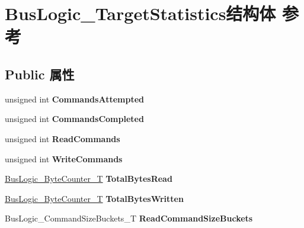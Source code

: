 \hypertarget{struct_bus_logic___target_statistics}{}\section{Bus\+Logic\+\_\+\+Target\+Statistics结构体 参考}
\label{struct_bus_logic___target_statistics}
\subsection*{Public 属性}
\begin{DoxyCompactItemize}
\item 
\mbox{\label{struct_bus_logic___target_statistics_a99b64ddca54d20f89863471aaa9c0d3e}} 
unsigned int {\bfseries Commands\+Attempted}
\item 
\mbox{\label{struct_bus_logic___target_statistics_a0f51c87caa558aac1d8c3b4694fbb81d}} 
unsigned int {\bfseries Commands\+Completed}
\item 
\mbox{\label{struct_bus_logic___target_statistics_a5391378dbcb342d84d25722ca0abeca8}} 
unsigned int {\bfseries Read\+Commands}
\item 
\mbox{\label{struct_bus_logic___target_statistics_a23b9a383a0785678bf3bf4a602c0ccfe}} 
unsigned int {\bfseries Write\+Commands}
\item 
\mbox{\label{struct_bus_logic___target_statistics_abc62f6380035545e3a634aa6a6d12ca5}} 
\hyperlink{struct_bus_logic___byte_counter}{Bus\+Logic\+\_\+\+Byte\+Counter\+\_\+T} {\bfseries Total\+Bytes\+Read}
\item 
\mbox{\label{struct_bus_logic___target_statistics_ae7ae2cad75d187b6facc6dc447724c79}} 
\hyperlink{struct_bus_logic___byte_counter}{Bus\+Logic\+\_\+\+Byte\+Counter\+\_\+T} {\bfseries Total\+Bytes\+Written}
\item 
\mbox{\label{struct_bus_logic___target_statistics_a1c725b455afda38fdb5cb3d0da7c9542}} 
Bus\+Logic\+\_\+\+Command\+Size\+Buckets\+\_\+T {\bfseries Read\+Command\+Size\+Buckets}

\end{DoxyCompactItemize}
